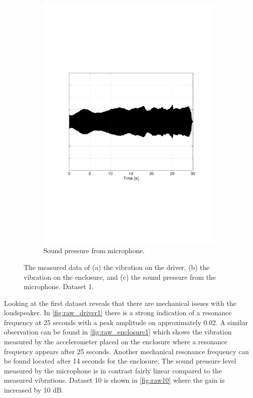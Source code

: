 \begin{figure}[H]
\begin{subfigure}[t]{0.3\textwidth}
	\includegraphics[width=1\textwidth]{figures/raw_microphone1.pdf}
	\caption{Sound pressure from microphone.}
	\label{fig:raw_microphone1}
\end{subfigure}
\caption{The measured data of (a) the vibration on the driver, (b) the vibration on the enclosure, and (c) the sound pressure from the microphone. Dataset 1.}
\label{fig:raw1}
\end{figure} 

Looking at the first dataset reveals that there are mechanical issues with the loudspeaker. In \autoref{fig:raw_driver1} there is a strong indication of a resonance frequency at 25 seconds with a peak amplitude on approximately 0.02. A similar observation can be found in \autoref{fig:raw_enclosure1} which shows the vibration measured by the accelerometer placed on the enclosure where a resonance frequency appears after 25 seconds. Another mechanical resonance frequency can be found located after 14 seconds for the enclosure. The sound pressure level measured by the microphone is in contrast fairly linear compared to the measured vibrations. Dataset 10 is shown in \autoref{fig:raw10} where the gain is increased by 10 dB.


